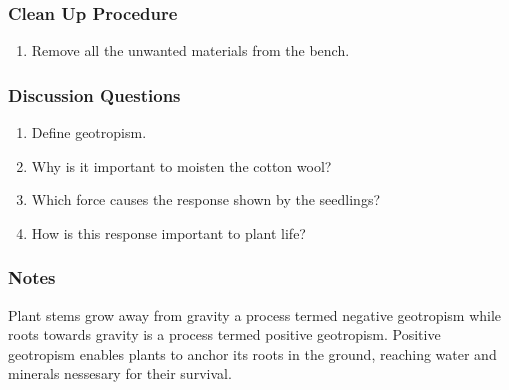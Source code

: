 \subsubsection*{Clean Up Procedure}
\begin{enumerate}
\item{Remove all the unwanted materials from the bench.}
\end{enumerate}

\subsubsection*{Discussion Questions}
\begin{enumerate}
\item{Define geotropism.}
\item{Why is it important to moisten the cotton wool?}
\item{Which force causes the response shown by the seedlings?}
\item{How is this response important to plant life?}
\end{enumerate}

\subsubsection*{Notes}
Plant stems grow away from gravity a process termed negative geotropism while roots towards gravity is a process termed positive geotropism.  Positive geotropism enables plants to anchor its roots in the ground, reaching water and minerals nessesary for their survival.
